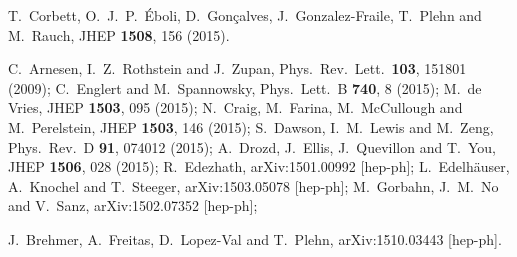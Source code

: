   T.~Corbett, O.~J.~P.~\'Eboli, D.~Gon\c{c}alves, J.~Gonzalez-Fraile, T.~Plehn and M.~Rauch,
  JHEP {\bf 1508}, 156 (2015).
  
  C.~Arnesen, I.~Z.~Rothstein and J.~Zupan,
  Phys.\ Rev.\ Lett.\  {\bf 103}, 151801 (2009);
  C.~Englert and M.~Spannowsky,
  Phys.\ Lett.\ B {\bf 740}, 8 (2015);
  M.~de Vries,
  JHEP {\bf 1503}, 095 (2015);
  N.~Craig, M.~Farina, M.~McCullough and M.~Perelstein,
  JHEP {\bf 1503}, 146 (2015);
  S.~Dawson, I.~M.~Lewis and M.~Zeng,
  Phys.\ Rev.\ D {\bf 91}, 074012 (2015);
  A.~Drozd, J.~Ellis, J.~Quevillon and T.~You,
  JHEP {\bf 1506}, 028 (2015);
  R.~Edezhath,
  arXiv:1501.00992 [hep-ph];
  L.~Edelh\"auser, A.~Knochel and T.~Steeger,
  arXiv:1503.05078 [hep-ph];
  M.~Gorbahn, J.~M.~No and V.~Sanz,
  arXiv:1502.07352 [hep-ph];

  J.~Brehmer, A.~Freitas, D.~Lopez-Val and T.~Plehn,
  arXiv:1510.03443 [hep-ph].

